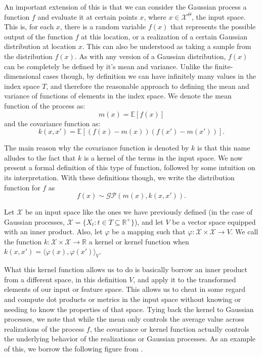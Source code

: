 An important extension of this is that we can consider the Gaussian process a function $f$ and evaluate it at certain points $x$, where $x \in \mathcal{X}^\Theta$, the input space. This is, for each $x$, there is a random variable $f(x)$ that represents the possible output of the function $f$ at this location, or a realization of a certain Gaussian distribution at location $x$. This can also be understood as taking a sample from the distribution $f(x)$. As with any version of a Gaussian distribution, $f(x)$ can be completely be defined by it's mean and variance. Unlike the finite-dimensional cases though, by definition we can have infinitely many values in the index space $T$, and therefore the reasonable approach to defining the mean and variance of functions of elements in the index space. We denote the mean function of the process as: 
\[ m(x) = \mathbb{E}[f(x)] \]
and the covariance function as: 
\[ k(x, x') = \mathbb{E}[(f(x) - m(x))(f(x') - m(x'))]. \]

The main reason why the covariance function is denoted by $k$ is that this name alludes to the fact that $k$ is a kernel of the terms in the input space. We now present a formal definition of this type of function, followed by some intuition on its interpretation. With these definitions though, we write the distribution function for $f$ as 
\[ f(x) \sim \mathcal{GP}(m(x), k(x,x')). \]

\begin{definition}
	Let $\mathcal{X}$ be an input space like the ones we have previously defined (in the case of Gaussian processes, $\mathcal{X} = \{ X_t : t \in T \subseteq \mathbb{R}^+ \}$), and let $V$ be a vector space equipped with an inner product. Also, let $\varphi$ be a mapping such that $\varphi: \mathcal{X} \times \mathcal{X} \rightarrow V$. We call the function $k: \mathcal{X} \times \mathcal{X} \rightarrow \mathbb{R}$ a kernel or kernel function when $k(x, x') = \langle \varphi (x), \varphi (x') \rangle_V$. 
\end{definition}

What this kernel function allows us to do is basically borrow an inner product from a different space, in this definition $V$, and apply it to the transformed elements of our input or feature space. This allows us to cheat in some regard and compute dot products or metrics in the input space without knowing or needing to know the properties of that space. Tying back the kernel to Gaussian processes, we note that while the mean only controls the average value across realizations of the process $f$, the covariance or kernel function actually controls the underlying behavior of the realizations or Gaussian processes. As an example of this, we borrow the following figure from \cite{ghahramani2011tutorial}. 

